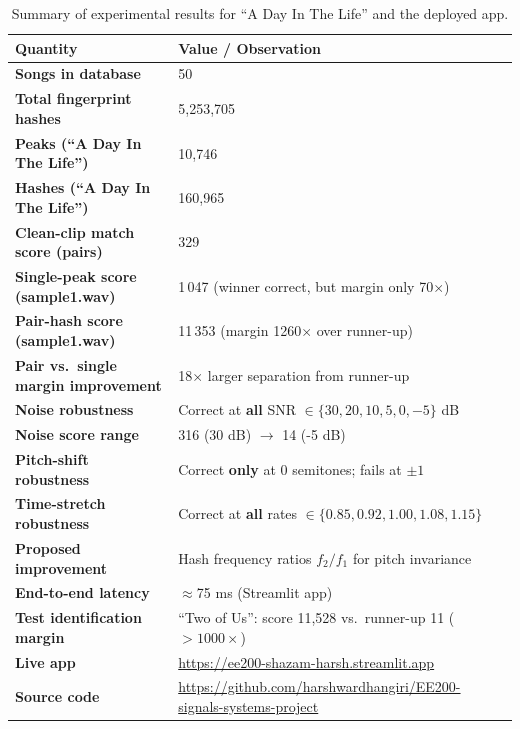 \documentclass[11pt,a4paper]{article}
\begin{document}
\begin{table}[H]
\centering\small
\renewcommand{\arraystretch}{1.25}
\begin{tabular}{>{\bfseries}p{6.5cm} p{8.5cm}}
\toprule
\rowcolor{tabhead!20}
\textbf{Quantity} & \textbf{Value / Observation} \\
\midrule
Songs in database           & 50 \\
Total fingerprint hashes    & 5{,}253{,}705 \\
Peaks (``A Day In The Life'') & 10{,}746 \\
Hashes (``A Day In The Life'') & 160{,}965 \\
Clean-clip match score (pairs) & 329 \\
Single-peak score (sample1.wav)   & 1\,047 (winner correct, but margin only 70$\times$) \\
Pair-hash score (sample1.wav)     & 11\,353 (margin 1260$\times$ over runner-up) \\
Pair vs.\ single margin improvement & 18$\times$ larger separation from runner-up \\
Noise robustness            & Correct at \textbf{all} SNR $\in \{30,20,10,5,0,-5\}$ dB \\
Noise score range           & 316 (30 dB) \ensuremath{\to} 14 (-5 dB) \\
Pitch-shift robustness      & Correct \textbf{only} at 0 semitones; fails at $\pm1$ \\
Time-stretch robustness     & Correct at \textbf{all} rates $\in \{0.85,0.92,1.00,1.08,1.15\}$ \\
Proposed improvement        & Hash frequency ratios $f_2/f_1$ for pitch invariance \\
End-to-end latency          & $\approx$75 ms (Streamlit app) \\
Test identification margin  & ``Two of Us'': score 11{,}528 vs.\ runner-up 11 ($>1000\times$) \\
Live app                    & \url{https://ee200-shazam-harsh.streamlit.app} \\
Source code                 & \url{https://github.com/harshwardhangiri/EE200-signals-systems-project} \\
\bottomrule
\end{tabular}
\caption{Summary of experimental results for ``A Day In The Life'' and the deployed app.}
\label{tab:summary}
\end{table}

\end{document}
